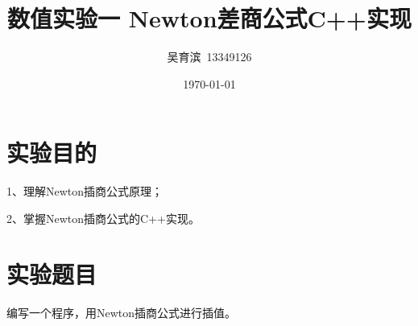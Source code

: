 \documentclass[hyperref,UTF8,c5size]{ctexart}
\title{\heiti\zihao{2}数值实验一 Newton差商公式C++实现}
\author{\kaishu 吴育滨\ 13349126}
\date{\today}
\begin{document}
\maketitle







\pagestyle{plain}
\section{实验目的}
        1、理解Newton插商公式原理；

        2、掌握Newton插商公式的C++实现。

\section{实验题目}
        编写一个程序，用Newton插商公式进行插值。
\end{document}
